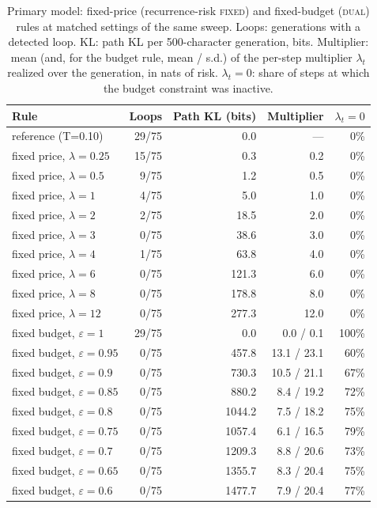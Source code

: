 \documentclass[make,article,submit,pdftex]{Definitions/mdpi}
\begin{document}
\begin{table}[H]
\centering
\caption{Primary model: fixed-price (recurrence-risk \textsc{fixed}) and fixed-budget (\textsc{dual}) rules at matched settings of the same sweep. Loops: generations with a detected loop. KL: path KL per 500-character generation, bits. Multiplier: mean (and, for the budget rule, mean / s.d.) of the per-step multiplier $\lambda_t$ realized over the generation, in nats of risk. $\lambda_t=0$: share of steps at which the budget constraint was inactive.}
\label{tab:frontier}
\begin{tabular}{@{}lrrrr@{}}
\toprule
Rule & Loops & Path KL (bits) & Multiplier & $\lambda_t=0$ \\
\midrule
reference (T=0.10) & 29/75 & 0.0 & --- & 0\% \\
fixed price, $\lambda{=}0.25$ & 15/75 & 0.3 & 0.2 & 0\% \\
fixed price, $\lambda{=}0.5$ & 9/75 & 1.2 & 0.5 & 0\% \\
fixed price, $\lambda{=}1$ & 4/75 & 5.0 & 1.0 & 0\% \\
fixed price, $\lambda{=}2$ & 2/75 & 18.5 & 2.0 & 0\% \\
fixed price, $\lambda{=}3$ & 0/75 & 38.6 & 3.0 & 0\% \\
fixed price, $\lambda{=}4$ & 1/75 & 63.8 & 4.0 & 0\% \\
fixed price, $\lambda{=}6$ & 0/75 & 121.3 & 6.0 & 0\% \\
fixed price, $\lambda{=}8$ & 0/75 & 178.8 & 8.0 & 0\% \\
fixed price, $\lambda{=}12$ & 0/75 & 277.3 & 12.0 & 0\% \\
fixed budget, $\varepsilon{=}1$ & 29/75 & 0.0 & 0.0 / 0.1 & 100\% \\
fixed budget, $\varepsilon{=}0.95$ & 0/75 & 457.8 & 13.1 / 23.1 & 60\% \\
fixed budget, $\varepsilon{=}0.9$ & 0/75 & 730.3 & 10.5 / 21.1 & 67\% \\
fixed budget, $\varepsilon{=}0.85$ & 0/75 & 880.2 & 8.4 / 19.2 & 72\% \\
fixed budget, $\varepsilon{=}0.8$ & 0/75 & 1044.2 & 7.5 / 18.2 & 75\% \\
fixed budget, $\varepsilon{=}0.75$ & 0/75 & 1057.4 & 6.1 / 16.5 & 79\% \\
fixed budget, $\varepsilon{=}0.7$ & 0/75 & 1209.3 & 8.8 / 20.6 & 73\% \\
fixed budget, $\varepsilon{=}0.65$ & 0/75 & 1355.7 & 8.3 / 20.4 & 75\% \\
fixed budget, $\varepsilon{=}0.6$ & 0/75 & 1477.7 & 7.9 / 20.4 & 77\% \\

\end{tabular}
\end{table}
\end{document}

